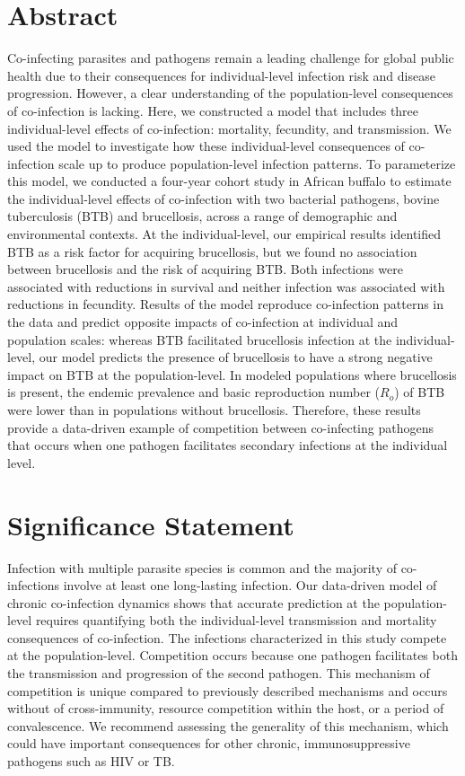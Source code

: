 \documentclass[10pt,letterpaper]{article}
\begin{document}
\section*{Abstract}
Co-infecting parasites and pathogens remain a leading challenge for global public health due to their consequences for individual-level infection risk and disease progression. 
However, a clear understanding of the population-level consequences of co-infection is lacking. 
Here, we constructed a model that includes three individual-level effects of co-infection: mortality, fecundity, and transmission. 
We used the model to investigate how these individual-level consequences of co-infection scale up to produce population-level infection patterns.
To parameterize this model, we conducted a four-year cohort study in African buffalo to estimate the individual-level effects of co-infection with two bacterial pathogens, bovine tuberculosis (BTB) and brucellosis, across a range of demographic and environmental contexts.
At the individual-level, our empirical results identified BTB as a risk factor for acquiring brucellosis, but we found no association between brucellosis and the risk of acquiring BTB. 
Both infections were associated with reductions in survival and neither infection was associated with reductions in fecundity. 
Results of the model reproduce co-infection patterns in the data and predict opposite impacts of co-infection at individual and population scales: whereas BTB facilitated brucellosis infection at the individual-level, our model predicts the presence of brucellosis to have a strong negative impact on BTB at the population-level.
In modeled populations where brucellosis is present, the endemic prevalence and basic reproduction number ($R_o$) of BTB were lower than in populations without brucellosis. 
Therefore, these results provide a data-driven example of competition between co-infecting pathogens that occurs when one pathogen facilitates secondary infections at the individual level.

\section*{Significance Statement}
Infection with multiple parasite species is common and the majority of co-infections involve at least one long-lasting infection. 
Our data-driven model of chronic co-infection dynamics shows that accurate prediction at the population-level requires quantifying both the individual-level transmission and mortality consequences of co-infection. 
The infections characterized in this study compete at the population-level. Competition occurs because one pathogen facilitates both the transmission and progression of the second pathogen. 
This mechanism of competition is unique compared to previously described mechanisms and occurs without of cross-immunity, resource competition within the host, or a period of convalescence.
We recommend assessing the generality of this mechanism, which could have important consequences for other chronic, immunosuppressive pathogens such as HIV or TB.
\end{document}
